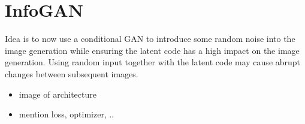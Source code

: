     \section{InfoGAN}

        Idea is to now use a conditional GAN to introduce some random noise into the image generation while ensuring the latent code has a high impact on the image generation. Using random input together with the latent code may cause abrupt changes between subsequent images.
        \begin{itemize}
            \item image of architecture
            \item mention loss, optimizer, ..
        \end{itemize}